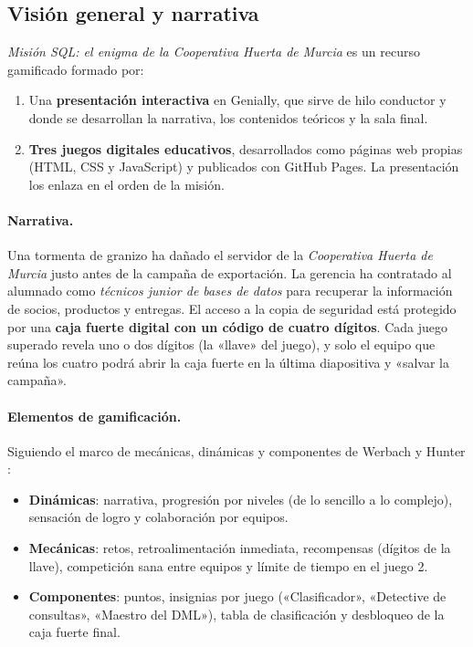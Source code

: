 \documentclass[11pt,a4paper]{article}
\begin{document}
\subsection{Visión general y narrativa}

\emph{Misión SQL: el enigma de la Cooperativa Huerta de Murcia} es un recurso gamificado
formado por:

\begin{enumerate}
  \item Una \textbf{presentación interactiva} en Genially, que sirve de hilo conductor
        y donde se desarrollan la narrativa, los contenidos teóricos y la sala final.
  \item \textbf{Tres juegos digitales educativos}, desarrollados como páginas web propias
        (HTML, CSS y JavaScript) y publicados con GitHub Pages. La presentación los enlaza
        en el orden de la misión.
\end{enumerate}

\paragraph{Narrativa.} Una tormenta de granizo ha dañado el servidor de la
\emph{Cooperativa Huerta de Murcia} justo antes de la campaña de exportación. La gerencia
ha contratado al alumnado como \emph{técnicos junior de bases de datos} para recuperar la
información de socios, productos y entregas. El acceso a la copia de seguridad está protegido
por una \textbf{caja fuerte digital con un código de cuatro dígitos}. Cada juego superado
revela uno o dos dígitos (la «llave» del juego), y solo el equipo que reúna los cuatro
podrá abrir la caja fuerte en la última diapositiva y «salvar la campaña».

\paragraph{Elementos de gamificación.} Siguiendo el marco de mecánicas, dinámicas y
componentes de Werbach y Hunter \cite{werbach2012}:

\begin{itemize}
  \item \textbf{Dinámicas}: narrativa, progresión por niveles (de lo sencillo a lo complejo),
        sensación de logro y colaboración por equipos.
  \item \textbf{Mecánicas}: retos, retroalimentación inmediata, recompensas (dígitos
        de la llave), competición sana entre equipos y límite de tiempo en el juego 2.
  \item \textbf{Componentes}: puntos, insignias por juego («Clasificador»,
        «Detective de consultas», «Maestro del DML»), tabla de clasificación y desbloqueo
        de la caja fuerte final.
\end{itemize}
\end{document}
